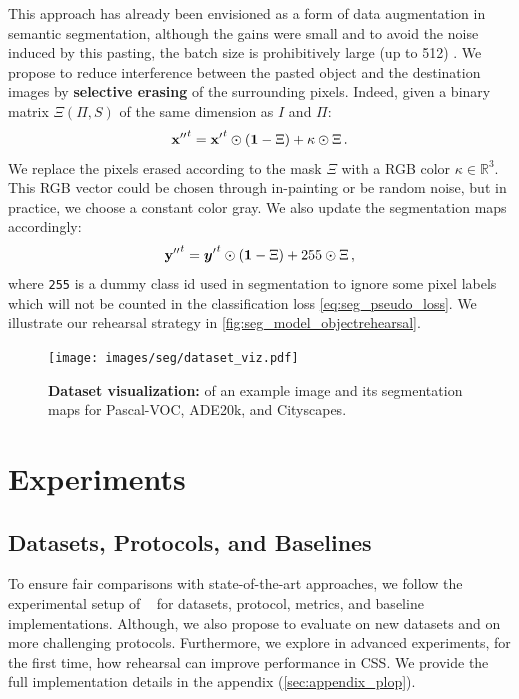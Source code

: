 This approach has already been envisioned as a form of data augmentation in semantic segmentation,
although the gains were small and to avoid the noise induced by this pasting, the batch size is
prohibitively large (up to 512) \citep{ghiasi2020simplecopypaste}. We propose to reduce interference
between the pasted object and the destination images by \textbf{selective erasing} of the
surrounding pixels. Indeed, given a binary matrix $\Xi(\Pi, S)$ of the same dimension as $I$ and
$\Pi$:
%
\begin{equation}
    {\mathbf{x}''}^t = {\mathbf{x}'}^t \odot (\mathbf{1} - \Xi) + \kappa \odot \Xi\,.
    \label{eq:seg_erasing_pixel}
\end{equation}
%
We replace the pixels erased according to the mask $\Xi$ with a RGB color $\kappa \in \mathbb{R}^3$.
This RGB vector could be chosen through in-painting \citep{fang2019instaboost} or be random noise,
but in practice, we choose a constant color gray. We also update the segmentation maps accordingly:
%
\begin{equation}
    {\mathbf{y}''}^t = {{\bm{y}}'}^t \odot (\mathbf{1} - \Xi) + 255 \odot \Xi\,,
    \label{eq:seg_erasing_label}
\end{equation}
%
\noindent where \texttt{255} is a dummy class id used in segmentation to ignore some pixel labels
which will not be counted in the classification loss \autoref{eq:seg_pseudo_loss}. We illustrate our
rehearsal strategy in \autoref{fig:seg_model_objectrehearsal}.



\begin{figure}
    \centering
    \texttt{[image: images/seg/dataset\_viz.pdf]}
    \caption{\textbf{Dataset visualization:} of an example image and its segmentation maps for
        Pascal-VOC, ADE20k, and Cityscapes.}
    \label{fig:seg_dataset_viz}
\end{figure}

\section{Experiments}
\label{sec:seg_exp}

\subsection{Datasets, Protocols, and Baselines}
\label{sec:seg_datasets_protocols}

To ensure fair comparisons with state-of-the-art approaches, we follow the experimental setup of
~\citet{cermelli2020modelingthebackground} for datasets, protocol, metrics, and baseline
implementations. Although, we also propose to evaluate on new datasets and on more challenging
protocols. Furthermore, we explore in advanced experiments, for the first time, how rehearsal can
improve performance in \ac{CSS}. We provide the full implementation details in the appendix
(\autoref{sec:appendix_plop}).

